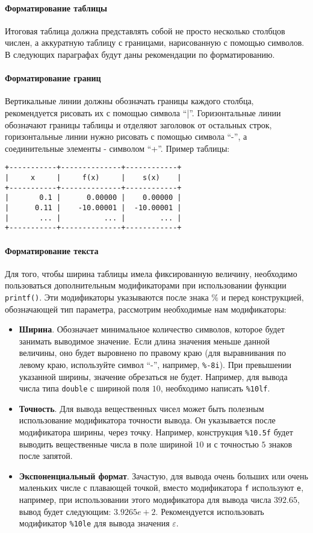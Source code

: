 \paragraph{Форматирование таблицы}
Итоговая таблица должна представлять собой не просто несколько столбцов числен, а аккуратную таблицу с границами, нарисованную с помощью символов. В следующих параграфах будут даны рекомендации по форматированию.

\paragraph{Форматирование границ}
Вертикальные линии должны обозначать границы каждого столбца, рекомендуется рисовать их с помощью символа ``|''. Горизонтальные линии обозначают границы таблицы и отделяют заголовок от остальных строк, горизонтальные линии нужно рисовать с помощью символа ``-'', а соединительные элементы - символом ``+''. Пример таблицы:
\begin{verbatim}
+-----------+--------------+------------+
|     x     |     f(x)     |    s(x)    |
+-----------+--------------+------------+
|       0.1 |      0.00000 |    0.00000 |
|      0.11 |    -10.00001 |  -10.00001 |
|       ... |          ... |        ... |
+-----------+--------------+------------+
\end{verbatim}
\paragraph{Форматирование текста}
 Для того, чтобы ширина таблицы имела фиксированную величину, необходимо пользоваться дополнительным модификаторами при использовании функции \texttt{printf()}\cite{cppref}. Эти модификаторы указываются после знака $\%$ и перед конструкцией, обозначающей тип параметра, рассмотрим необходимые нам модификаторы:
\begin{itemize}
	\item \textbf{Ширина}. Обозначает минимальное количество символов, которое будет занимать выводимое значение. Если длина значения меньше данной величины, оно будет выровнено по правому краю (для выравнивания по левому краю, используйте символ ``-'', например, \verb|%-8i|). При превышении указанной ширины, значение обрезаться не будет. Например, для вывода числа типа \texttt{double} с шириной поля $10$, необходимо написать \verb|%10lf|.
	\item \textbf{Точность}. Для вывода вещественных чисел может быть полезным использование модификатора точности вывода. Он указывается после модификатора ширины, через точку. Например, конструкция \verb|%10.5f| будет выводить вещественные числа в поле шириной $10$ и с точностью $5$ знаков после запятой.
	\item \textbf{Экспоненциальный формат}. Зачастую, для вывода очень больших или очень маленьких числе с плавающей точкой, вместо модификатора \verb|f| используют \verb|e|, например, при использовании этого модификатора для вывода числа $392.65$, вывод будет следующим: $3.9265e+2$. Рекомендуется использовать модификатор \verb|%10le| для вывода значения $\varepsilon$. 
\end{itemize}


